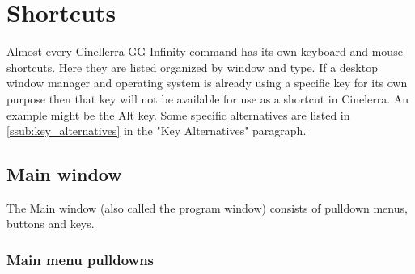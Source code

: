 \chapter{Shortcuts}%
\label{cha:shortcuts}

Almost every Cinellerra GG Infinity command has its own keyboard and mouse shortcuts. Here 
they are listed organized by window and type.  If a desktop window manager and operating
system is already using a specific key for its own purpose then that key will not be available
for use as a shortcut in Cinelerra. An example might be the Alt key. Some specific alternatives 
are listed in \ref{ssub:key_alternatives} in the "Key Alternatives" paragraph.

\section{Main window }%
\label{sec:main_window}

The Main window (also called the program window) consists of pulldown menus, buttons and keys.

\subsection{Main menu pulldowns}%
\label{sub:main_menu_pulldowns}

